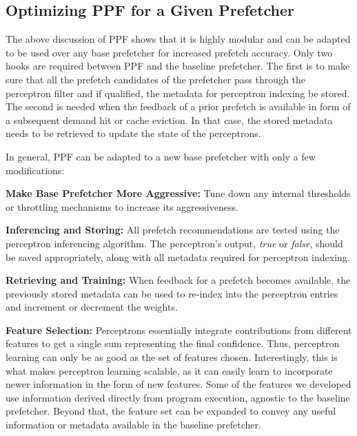 \subsection{Optimizing PPF for a Given Prefetcher}
\label{Arch-Generalizing}
The above discussion of PPF shows that it is highly modular and can be
adapted to be used over any base prefetcher for increased prefetch
accuracy.  Only two hooks are required between PPF and the baseline
prefetcher.  The first is to make sure that all the prefetch
candidates of the prefetcher pass through the perceptron filter and if
qualified, the metadata for perceptron indexing be stored. The second
is needed when the feedback of a prior prefetch is available in form
of a subsequent demand hit or cache eviction. In that case, the stored
metadata needs to be retrieved to update the state of the perceptrons.


In general, PPF can be adapted to a new base prefetcher with only a
few modifications:

\noindent \textbf{Make Base Prefetcher More Aggressive:} Tune down any
internal thresholds or throttling mechanisms to increase its
aggressiveness.

\noindent \textbf{Inferencing and Storing:} All prefetch
recommendations are tested using the perceptron inferencing algorithm.
The perceptron's output, \textit{true} or \textit{false}, should be
saved appropriately, along with all metadata required for perceptron
indexing.

\noindent \textbf{Retrieving and Training:} When feedback for a
prefetch becomes available, the previously stored metadata can be used
to re-index into the perceptron entries and increment or decrement the
weights.

\noindent \textbf{Feature Selection:} Perceptrons essentially
integrate contributions from different features to get a single sum
representing the final confidence.  Thus, perceptron learning can only
be as good as the set of features chosen.  Interestingly, this is what
makes perceptron learning scalable, as it can easily learn to
incorporate newer information in the form of new features.  Some of
the features we developed use information derived directly from
program execution, agnostic to the baseline prefetcher.  Beyond that,
the feature set can be expanded to convey any useful information or
metadata available in the baseline prefetcher.


